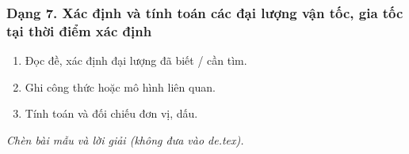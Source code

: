 \subsubsection{Dạng 7. Xác định và tính toán các đại lượng vận tốc, gia tốc tại thời điểm xác định}
\begin{phuongphap}
\begin{enumerate}
\item Đọc đề, xác định đại lượng đã biết / cần tìm.
\item Ghi công thức hoặc mô hình liên quan.
\item Tính toán và đối chiếu đơn vị, dấu.
\end{enumerate}
\end{phuongphap}
\begin{vidumau}
\textit{Chèn bài mẫu và lời giải (không đưa vào de.tex).}
\end{vidumau}

